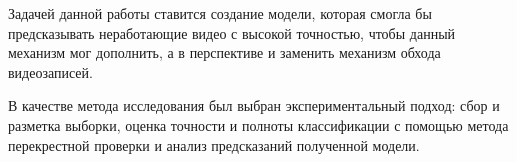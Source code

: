 Задачей данной работы ставится создание модели, которая смогла бы предсказывать неработающие видео с высокой точностью, чтобы данный механизм мог дополнить,  а в перспективе и заменить механизм обхода видеозаписей.

В качестве метода исследования был выбран экспериментальный подход: сбор и разметка выборки, оценка точности и полноты классификации с помощью метода перекрестной проверки и анализ предсказаний полученной модели.